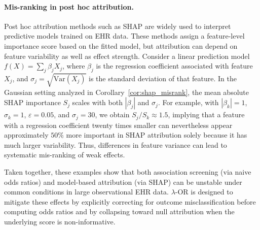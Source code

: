 \documentclass[pdflatex,sn-mathphys-num]{sn-jnl}%
\newcommand{\SPOR}{\textrm{$\lambda$-OR}}
\theoremstyle{thmstyleone}%
\theoremstyle{thmstyletwo}%
\theoremstyle{thmstylethree}%
\begin{document}
\paragraph{Mis-ranking in post hoc attribution.}
Post hoc attribution methods such as SHAP are widely used to interpret predictive models trained on EHR data. These methods assign a feature-level importance score based on the fitted model, but attribution can depend on feature variability as well as effect strength. Consider a linear prediction model $ f(X)=\sum_{j}\beta_j X_j$, 
where $\beta_j$ is the regression coefficient associated with feature $X_j$, and $\sigma_j=\sqrt{\mathrm{Var}(X_j)}$ is the standard deviation of that feature. In the Gaussian setting analyzed in Corollary~\ref{cor:shap_misrank}, the mean absolute SHAP importance $S_j$ scales with both $|\beta_j|$ and $\sigma_j$. For example, with $|\beta_k|=1$, $\sigma_k=1$, $\varepsilon=0.05$, and $\sigma_j=30$, we obtain $S_j/S_k\approx 1.5$, implying that a feature with a regression coefficient twenty times smaller can nevertheless appear approximately $50\%$ more important in SHAP attribution solely because it has much larger variability. Thus, differences in feature variance can  lead to systematic mis-ranking of weak effects.

Taken together, these examples show that both association screening (via naive odds ratios) and model-based attribution (via SHAP) can be unstable under common conditions in large observational EHR data. $\SPOR$ is designed to mitigate these effects by explicitly correcting for outcome misclassification before computing odds ratios and by collapsing toward null attribution when the underlying score is non-informative.
\end{document}
